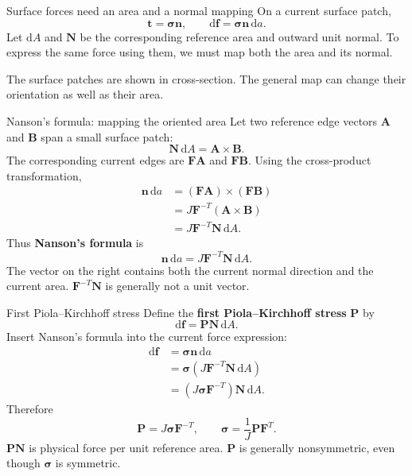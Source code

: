 \documentclass[11pt,aspectratio=169]{beamer}
\newcommand{\bn}{\bm n}
\newcommand{\bN}{\bm N}
\newcommand{\bt}{\bm t}
\newcommand{\bF}{\bm F}
\newcommand{\bP}{\bm P}
\newcommand{\bsig}{\bm\sigma}
\begin{document}
\begin{frame}{Surface forces need an area and a normal mapping}
On a current surface patch,
\[
\bt=\bsig\bn,\qquad
\mathrm d\bm f=\bsig\bn\,\mathrm da.
\]
Let $\mathrm dA$ and $\bN$ be the corresponding reference area and outward
unit normal. To express the same force using them, we must map both the area
and its normal.
\begin{center}
\end{center}
The surface patches are shown in cross-section.
The general map can change their orientation as well as their area.
\end{frame}

\begin{frame}{Nanson's formula: mapping the oriented area}
Let two reference edge vectors $\bm A$ and $\bm B$ span a small surface patch:
\[
\bN\,\mathrm dA=\bm A\times\bm B.
\]
The corresponding current edges are $\bF\bm A$ and $\bF\bm B$.
Using the cross-product transformation,
\[
\begin{aligned}
\bn\,\mathrm da
&=(\bF\bm A)\times(\bF\bm B)\\
&=J\bF^{-T}(\bm A\times\bm B)\\
&=J\bF^{-T}\bN\,\mathrm dA.
\end{aligned}
\]
Thus \textbf{Nanson's formula} is
\[
\boxed{\bn\,\mathrm da=J\bF^{-T}\bN\,\mathrm dA.}
\]
The vector on the right contains both the current normal direction and
the current area. $\bF^{-T}\bN$ is generally not a unit vector.
\end{frame}

\begin{frame}{First Piola--Kirchhoff stress}
Define the \textbf{first Piola--Kirchhoff stress} $\bP$ by
\[
\mathrm d\bm f=\bP\bN\,\mathrm dA.
\]
Insert Nanson's formula into the current force expression:
\[
\begin{aligned}
\mathrm d\bm f
&=\bsig\bn\,\mathrm da\\
&=\bsig\left(J\bF^{-T}\bN\,\mathrm dA\right)\\
&=\left(J\bsig\bF^{-T}\right)\bN\,\mathrm dA.
\end{aligned}
\]
Therefore
\[
\boxed{\bP=J\bsig\bF^{-T},\qquad
\bsig=\frac1J\bP\bF^T.}
\]
$\bP\bN$ is physical force per unit reference area.
$\bP$ is generally nonsymmetric, even though $\bsig$ is symmetric.
\end{frame}
\end{document}
